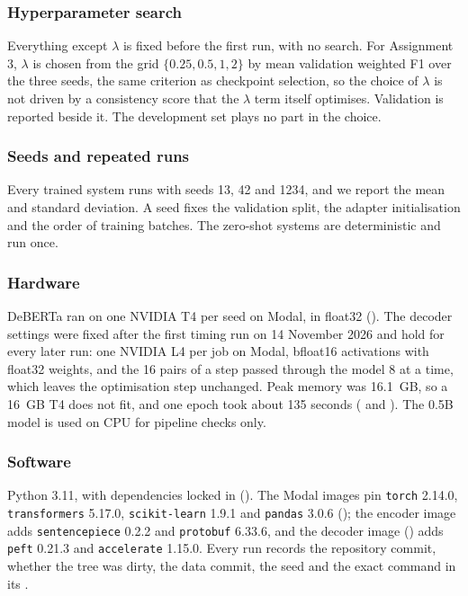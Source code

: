 \subsubsection*{Hyperparameter search}
Everything except $\lambda$ is fixed before the first run, with no search. For Assignment 3, $\lambda$ is chosen from the grid $\{0.25, 0.5, 1, 2\}$ by mean validation weighted F1 over the three seeds, the same criterion as checkpoint selection, so the choice of $\lambda$ is not driven by a consistency score that the $\lambda$ term itself optimises. Validation \HardCons{} is reported beside it. The development set plays no part in the choice.

\subsubsection*{Seeds and repeated runs}
Every trained system runs with seeds 13, 42 and 1234, and we report the mean and standard deviation. A seed fixes the validation split, the adapter initialisation and the order of training batches. The zero-shot systems are deterministic and run once.

\subsubsection*{Hardware}
DeBERTa ran on one NVIDIA T4 per seed on Modal, in float32 (). The decoder settings were fixed after the first timing run on 14 November 2026 and hold for every later run: one NVIDIA L4 per job on Modal, bfloat16 activations with float32 weights, and the 16 pairs of a step passed through the model 8 at a time, which leaves the optimisation step unchanged. Peak memory was 16.1~GB, so a 16~GB T4 does not fit, and one epoch took about 135 seconds ( and ). The 0.5B model is used on CPU for pipeline checks only.

\subsubsection*{Software}
Python 3.11, with dependencies locked in  (). The Modal images pin \texttt{torch} 2.14.0, \texttt{transformers} 5.17.0, \texttt{scikit-learn} 1.9.1 and \texttt{pandas} 3.0.6 (); the encoder image adds \texttt{sentencepiece} 0.2.2 and \texttt{protobuf} 6.33.6, and the decoder image () adds \texttt{peft} 0.21.3 and \texttt{accelerate} 1.15.0. Every run records the repository commit, whether the tree was dirty, the data commit, the seed and the exact command in its .

